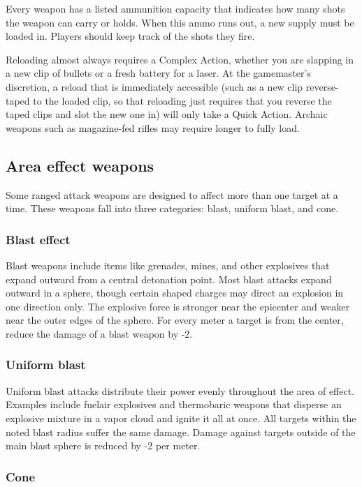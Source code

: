 Every weapon has a listed ammunition capacity that indicates how many shots the weapon can carry or holds. When this ammo runs out, a new supply must be loaded in. Players should keep track of the shots they fire.

Reloading almost always requires a Complex Action, whether you are slapping in a new clip of bullets or a fresh battery for a laser. At the gamemaster’s discretion, a reload that is immediately accessible (such as a new clip reverse-taped to the loaded clip, so that reloading just requires that you reverse the taped clips and slot the new one in) will only take a Quick Action. Archaic weapons such as magazine-fed rifles may require longer to fully load.


\subsection{Area effect weapons}
\label{sec:area-effect-weapons}

Some ranged attack weapons are designed to affect more than one target at a time. These weapons fall into three categories: blast, uniform blast, and cone.

\subsubsection{Blast effect}

Blast weapons include items like grenades, mines, and other explosives that expand outward from a central detonation point. Most blast attacks expand outward in a sphere, though certain shaped charges may direct an explosion in one direction only. The explosive force is stronger near the epicenter and weaker near the outer edges of the sphere. For every meter a target is from the center, reduce the damage of a blast weapon by -2.

\subsubsection{Uniform blast}

Uniform blast attacks distribute their power evenly throughout the area of effect. Examples include fuelair explosives and thermobaric weapons that disperse an explosive mixture in a vapor cloud and ignite it all at once. All targets within the noted blast radius suffer the same damage. Damage against targets outside of the main blast sphere is reduced by -2 per meter.

\subsubsection{Cone}

